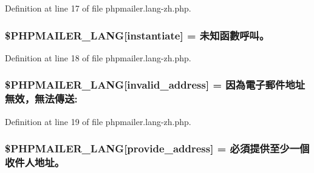 Definition at line 17 of file phpmailer.\+lang-\/zh.\+php.

\subsubsection[{\texorpdfstring{\$\+P\+H\+P\+M\+A\+I\+L\+E\+R\+\_\+\+L\+A\+NG}{$PHPMAILER_LANG}}]{\setlength{\rightskip}{0pt plus 5cm}\$P\+H\+P\+M\+A\+I\+L\+E\+R\+\_\+\+L\+A\+NG\mbox{[}\textquotesingle{}instantiate\textquotesingle{}\mbox{]} = \textquotesingle{}未知函數呼叫。\textquotesingle{}}\hypertarget{phpmailer_8lang-zh_8php_ad58dde16780f4770ccf4dd282ea1f5ad}{}\label{phpmailer_8lang-zh_8php_ad58dde16780f4770ccf4dd282ea1f5ad}


Definition at line 18 of file phpmailer.\+lang-\/zh.\+php.

\subsubsection[{\texorpdfstring{\$\+P\+H\+P\+M\+A\+I\+L\+E\+R\+\_\+\+L\+A\+NG}{$PHPMAILER_LANG}}]{\setlength{\rightskip}{0pt plus 5cm}\$P\+H\+P\+M\+A\+I\+L\+E\+R\+\_\+\+L\+A\+NG\mbox{[}\textquotesingle{}invalid\+\_\+address\textquotesingle{}\mbox{]} = \textquotesingle{}因為電子郵件地址無效，無法傳送\+: \textquotesingle{}}\hypertarget{phpmailer_8lang-zh_8php_a42d61bcea4c79599ecb44fd062f54d47}{}\label{phpmailer_8lang-zh_8php_a42d61bcea4c79599ecb44fd062f54d47}


Definition at line 19 of file phpmailer.\+lang-\/zh.\+php.

\subsubsection[{\texorpdfstring{\$\+P\+H\+P\+M\+A\+I\+L\+E\+R\+\_\+\+L\+A\+NG}{$PHPMAILER_LANG}}]{\setlength{\rightskip}{0pt plus 5cm}\$P\+H\+P\+M\+A\+I\+L\+E\+R\+\_\+\+L\+A\+NG\mbox{[}\textquotesingle{}provide\+\_\+address\textquotesingle{}\mbox{]} = \textquotesingle{}必須提供至少一個收件人地址。\textquotesingle{}}\hypertarget{phpmailer_8lang-zh_8php_a8b97897c2406b7392b056f375feeefbb}{}\label{phpmailer_8lang-zh_8php_a8b97897c2406b7392b056f375feeefbb}


